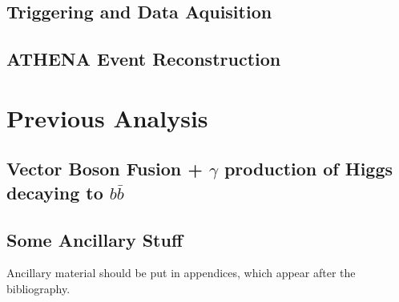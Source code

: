 \documentclass[11pt]{ucthesis}
\begin{document}
\chapter{Triggering and Data Aquisition}

\chapter{ATHENA Event Reconstruction}

\part{Previous Analysis}

\chapter{Vector Boson Fusion + \boldmath$\gamma$ production of Higgs decaying to
$b\bar{b}$}

\nocite{*}



\appendix
\chapter{Some Ancillary Stuff}

Ancillary material should be put in appendices, which appear after the
bibliography. 
\end{document}
